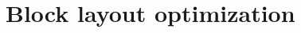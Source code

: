 \documentclass[preprint,12pt]{elsarticle}
\begin{document}
\section{Block layout optimization}

	







\end{document}
